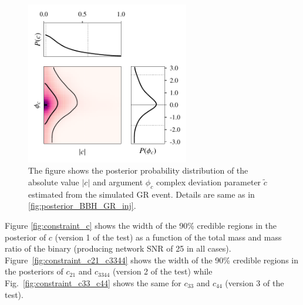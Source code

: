 \documentclass[prd,preprintnumbers,twocolumn,eqsecnum,floatfix,a4paper,nofootinbib,superscriptaddress]{revtex4}
\begin{document}
 \begin{figure}[tbh]
 	\begin{center}
 		\includegraphics[width=2.8in]{figs/M_80_q_9_SNR_25_complex_c1.pdf}
 	\end{center} 
 	\caption{The figure shows the posterior probability distribution of the absolute value $|c|$ and argument $\phi_c$ complex deviation parameter $\tilde{c}$ estimated from the simulated GR event. Details are same as in \ref{fig:posterior_BBH_GR_inj}.}
 	\label{fig:c1_complex}
 \end{figure}
 


Figure \ref{fig:constraint_c} shows the width of the 90\% credible regions in the posterior of $c$  (version 1 of the test) as a function of the total mass and mass ratio of the binary (producing network SNR of 25 in all cases). Figure~\ref{fig:constraint_c21_c3344} shows the width of the 90\% credible regions in the posteriors of $c_{21}$ and  $c_{3344}$  (version 2 of the test) while Fig.~\ref{fig:constraint_c33_c44} shows the same for $c_{33}$ and  $c_{44}$  (version 3 of the test). 
\end{document}
